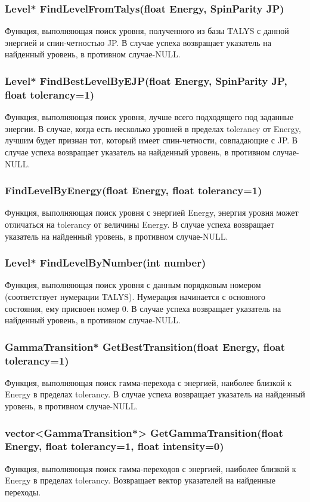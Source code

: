 \documentclass[a4paper,12pt]{extarticle}
\begin{document}
\subsubsection{Level* FindLevelFromTalys(float Energy, SpinParity JP)}
Функция, выполняющая поиск уровня, полученного из базы TALYS с данной энергией и спин-четностью JP. В случае успеха возвращает указатель на найденный уровень, в противном случае-NULL.
\subsubsection{Level* FindBestLevelByEJP(float Energy, SpinParity JP, float tolerancy=1)}
Функция, выполняющая поиск уровня, лучше всего подходящего под заданные энергии. В случае, когда есть несколько уровней в пределах tolerancy от Energy, лучшим будет признан тот, который имеет спин-четности, совпадающие с JP. В случае успеха возвращает указатель на найденный уровень, в противном случае-NULL.
\subsubsection{FindLevelByEnergy(float Energy, float tolerancy=1)}
Функция, выполняющая поиск уровня с энергией Energy, энергия уровня может отличаться на tolerancy от величины Energy. В случае успеха возвращает указатель на найденный уровень, в противном случае-NULL.
\subsubsection{Level* FindLevelByNumber(int number)}
Функция, выполняющая поиск уровня с данным порядковым номером (соответствует нумерации TALYS). Нумерация начинается с основного состояния, ему присвоен номер 0. В случае успеха возвращает указатель на найденный уровень, в противном случае-NULL.
\subsubsection{GammaTransition* GetBestTransition(float Energy, float tolerancy=1)}
Функция, выполняющая поиск гамма-перехода с энергией, наиболее близкой к Energy в пределах tolerancy. В случае успеха возвращает указатель на найденный уровень, в противном случае-NULL.
\subsubsection{vector<GammaTransition*> GetGammaTransition(float Energy, float tolerancy=1, float intensity=0)}
Функция, выполняющая поиск гамма-переходов с энергией, наиболее близкой к Energy в пределах tolerancy. Возвращает вектор указателей на найденные переходы.
\end{document}
